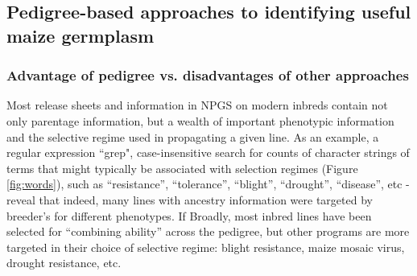 \documentclass[draft,12pt]{article}
\begin{document}
\subsection*{Pedigree-based approaches to identifying useful maize germplasm}


\subsubsection*{Advantage of pedigree vs. disadvantages of other approaches}
Most release sheets and information in NPGS on modern inbreds contain not only parentage information, but a wealth of important phenotypic information and the selective regime used in propagating a given line. 
As an example, a regular expression ``grep", case-insensitive search for counts of character strings of terms that might typically be associated with selection regimes  (Figure \ref{fig:words}), such as ``resistance'', ``tolerance'', ``blight'', ``drought'', ``disease'', etc - reveal that indeed, many lines with ancestry information were targeted by breeder's for different phenotypes. 
If 
Broadly, most inbred lines have been selected for ``combining ability'' across the pedigree, but other programs are more targeted in their choice of selective regime: blight resistance, maize mosaic virus, drought resistance, etc. 
\end{document}
